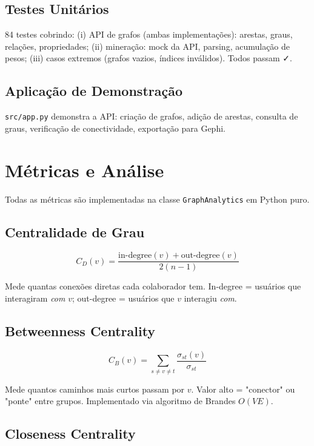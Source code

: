 \documentclass[12pt,a4paper]{article}
\begin{document}
\subsection{Testes Unitários}

84 testes cobrindo: (i) API de grafos (ambas implementações): arestas, graus, relações, propriedades; (ii) mineração: mock da API, parsing, acumulação de pesos; (iii) casos extremos (grafos vazios, índices inválidos). Todos passam ✓.

\subsection{Aplicação de Demonstração}

\texttt{src/app.py} demonstra a API: criação de grafos, adição de arestas, consulta de graus, verificação de conectividade, exportação para Gephi.

\section{Métricas e Análise}\label{sec:metricas}

Todas as métricas são implementadas na classe \texttt{GraphAnalytics} em Python puro.

\subsection{Centralidade de Grau}

\[
C_D(v) = \frac{\text{in-degree}(v) + \text{out-degree}(v)}{2(n-1)}
\]

Mede quantas conexões diretas cada colaborador tem. In-degree = usuários que interagiram \textit{com} $v$; out-degree = usuários que $v$ interagiu \textit{com}.

\subsection{Betweenness Centrality}

\[
C_B(v) = \sum_{s \neq v \neq t} \frac{\sigma_{st}(v)}{\sigma_{st}}
\]

Mede quantos caminhos mais curtos passam por $v$. Valor alto = "conector" ou "ponte" entre grupos. Implementado via algoritmo de Brandes $O(VE)$.

\subsection{Closeness Centrality}
\end{document}
